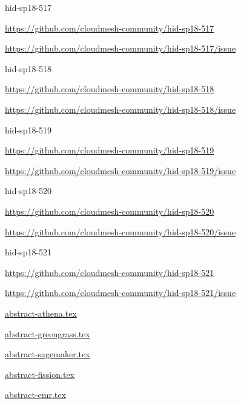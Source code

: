 \begin{IU}

hid-sp18-517

\url{https://github.com/cloudmesh-community/hid-sp18-517}

\url{https://github.com/cloudmesh-community/hid-sp18-517/issue}

\end{IU}


\begin{IU}

hid-sp18-518

\url{https://github.com/cloudmesh-community/hid-sp18-518}

\url{https://github.com/cloudmesh-community/hid-sp18-518/issue}

\end{IU}


\begin{IU}

hid-sp18-519

\url{https://github.com/cloudmesh-community/hid-sp18-519}

\url{https://github.com/cloudmesh-community/hid-sp18-519/issue}

\end{IU}


\begin{IU}

hid-sp18-520

\url{https://github.com/cloudmesh-community/hid-sp18-520}

\url{https://github.com/cloudmesh-community/hid-sp18-520/issue}

\end{IU}


\begin{IU}

hid-sp18-521

\url{https://github.com/cloudmesh-community/hid-sp18-521}

\url{https://github.com/cloudmesh-community/hid-sp18-521/issue}

\href{https://github.com/cloudmesh-community/hid-sp18-521/blob/master//technology/abstract-athena.tex}{abstract-athena.tex}

\href{https://github.com/cloudmesh-community/hid-sp18-521/blob/master//technology/abstract-greengrass.tex}{abstract-greengrass.tex}

\href{https://github.com/cloudmesh-community/hid-sp18-521/blob/master//technology/abstract-sagemaker.tex}{abstract-sagemaker.tex}

\href{https://github.com/cloudmesh-community/hid-sp18-521/blob/master//technology/abstract-fission.tex}{abstract-fission.tex}

\href{https://github.com/cloudmesh-community/hid-sp18-521/blob/master//technology/abstract-emr.tex}{abstract-emr.tex}

\end{IU}


